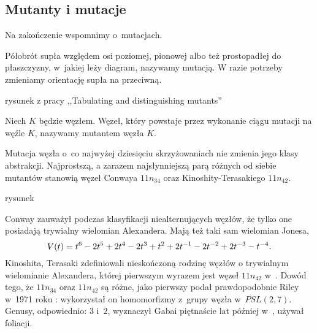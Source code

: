 \subsection{Mutanty i mutacje}
\label{sec:mutant}
Na zakończenie wspomnimy o~mutacjach.

\begin{definition}[mutacja]
    Półobrót supła względem osi poziomej, pionowej albo też prostopadłej do płaszczyzny, w~jakiej leży diagram, nazywamy mutacją.
    W razie potrzeby zmieniamy orientację supła na przeciwną.
\end{definition}

\begin{tobedone}
rysunek z pracy ,,Tabulating and distinguishing mutants''
\end{tobedone}

\begin{definition}[mutant]
    \label{def:mutant}
    Niech $K$ będzie węzłem.
    Węzeł, który powstaje przez wykonanie ciągu mutacji na węźle $K$, nazywamy mutantem węzła $K$.
\end{definition}

Mutacja węzła o~co najwyżej dziesięciu skrzyżowaniach nie zmienia jego klasy abstrakcji.
Najprostszą, a zarazem najsłynniejszą parą różnych od siebie mutantów stanowią węzeł Conwaya $11n_{34}$ oraz Kinoshity-Terasakiego $11n_{42}$.

\begin{tobedone}
rysunek
\end{tobedone}

Conway zauważył podczas klasyfikacji niealternujących węzłów, że tylko one posiadają trywialny wielomian Alexandera.
Mają też taki sam wielomian Jonesa,
\begin{equation}
    V(t) = t^{6} -2t^5 +2t^4 -2t^3 +t^2 +2t^{-1} -2t^{-2} +2t^{-3} -t^{-4}.
\end{equation}
Kinoshita, Terasaki zdefiniowali nieskończoną rodzinę węzłów o trywialnym wielomianie Alexandera, której pierwszym wyrazem jest węzeł $11n_{42}$ w~\cite{kinoshita57}.
Dowód tego, że $11n_{34}$ oraz $11n_{42}$ są różne, jako pierwszy podał prawdopodobnie Riley w~1971 roku \cite{riley71}: wykorzystał on homomorfizmy z~grupy węzła w~$PSL(2, 7)$.
Genusy, odpowiednio: $3$ i~$2$, wyznaczył Gabai piętnaście lat później w~\cite{gabai86}, używał foliacji.

